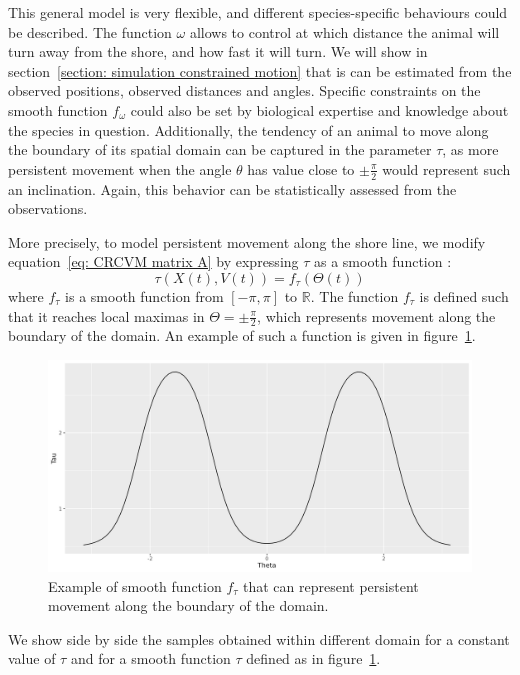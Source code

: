 \documentclass[11pt]{article}
\newcommand {\R}{\mathbb{R}}
\newcommand {\1}{\mathbb{1}}
\begin{document}
 This general model is very flexible, and different species-specific behaviours could be described. The function $\omega$ allows to control at which distance the animal will turn away from the shore, and how fast it will turn. We will show in section~\ref{section: simulation constrained motion} that is can be estimated from the observed positions, observed distances and angles. Specific constraints on the smooth function $f_{\omega}$ could also be set by biological expertise and knowledge about the species in question. Additionally, the tendency of an animal to move along the boundary of its spatial domain can be captured in the parameter $\tau$, as more persistent movement when the angle $\theta$ has value close to $\pm\frac{\pi}{2}$ would represent such an inclination. Again, this behavior can be statistically assessed from the observations. 
 
 More precisely, to model persistent movement along the shore line, we modify equation~\ref{eq: CRCVM matrix A} by expressing $\tau$ as a smooth function :
 \[\tau(X(t),V(t))=f_{\tau}(\Theta(t))\] where $f_{\tau}$ is a smooth function from $[-\pi,\pi]$ to $\R$.
 The function $f_{\tau}$ is defined such that it reaches local maximas in $\Theta=\pm\frac{\pi}{2}$, which represents movement along the boundary of the domain. An example of such a function is given in figure~\ref{fig:smoothtaubump}.
 \begin{figure}[H]
 	\centering
 	\includegraphics[scale=0.3]{images/crcvm/smooth_tau_bump}
 	\caption{Example of smooth function $f_{\tau}$ that can represent persistent movement along the boundary of the domain.}
 	\label{fig:smoothtaubump}
 \end{figure}
 
 We show side by side the samples obtained within different domain for a constant value of $\tau$ and for a smooth function $\tau$ defined as in figure~\ref{fig:smoothtaubump}.
 
\end{document}
